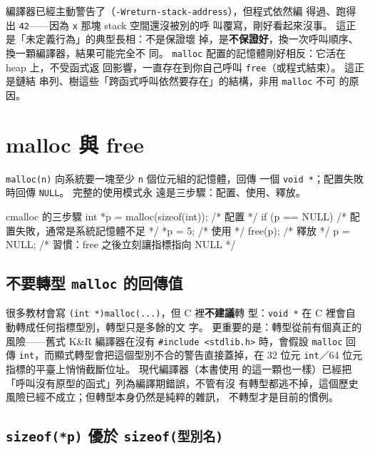
編譯器已經主動警告了（\texttt{-Wreturn-stack-address}），但程式依然編
得過、跑得出 \texttt{42}——因為 \texttt{x} 那塊 stack 空間還沒被別的呼
叫覆寫，剛好看起來沒事。 這正是「未定義行為」的典型長相：不是保證壞
掉，是\textbf{不保證好}，換一次呼叫順序、換一顆編譯器，結果可能完全不
同。 \texttt{malloc} 配置的記憶體剛好相反：它活在 heap 上，不受函式返
回影響，一直存在到你自己呼叫 \texttt{free}（或程式結束）。 這正是鏈結
串列、樹這些「跨函式呼叫依然要存在」的結構，非用 \texttt{malloc} 不可
的原因。


\section{malloc 與 free}
\label{sec:ds-malloc-free}

\texttt{malloc(n)} 向系統要一塊至少 \texttt{n} 個位元組的記憶體，回傳
一個 \texttt{void *}；配置失敗時回傳 \texttt{NULL}。 完整的使用模式永
遠是三步驟：配置、使用、釋放。

\begin{code}{c}{malloc 的三步驟}
int *p = malloc(sizeof(int));  /* 配置 */
if (p == NULL) {
    /* 配置失敗，通常是系統記憶體不足 */
}
*p = 5;                        /* 使用 */
free(p);                       /* 釋放 */
p = NULL;                      /* 習慣：free 之後立刻讓指標指向 NULL */
\end{code}

\subsection{不要轉型 \texttt{malloc} 的回傳值}

很多教材會寫 \texttt{(int *)malloc(...)}，但 C 裡\textbf{不建議}轉
型：\texttt{void *} 在 C 裡會自動轉成任何指標型別，轉型只是多餘的文
字。 更重要的是：轉型從前有個真正的風險——舊式 K\&R 編譯器在沒有
\texttt{\#include <stdlib.h>} 時，會假設 \texttt{malloc} 回傳
\texttt{int}，而顯式轉型會把這個型別不合的警告直接蓋掉，在 32 位元
\texttt{int}／64 位元指標的平臺上悄悄截斷位址。 現代編譯器（本書使用
的這一顆也一樣）已經把「呼叫沒有原型的函式」列為編譯期錯誤，不管有沒
有轉型都逃不掉，這個歷史風險已經不成立；但轉型本身仍然是純粹的雜訊，
不轉型才是目前的慣例。

\subsection{\texttt{sizeof(*p)} 優於 \texttt{sizeof(型別名)}}

